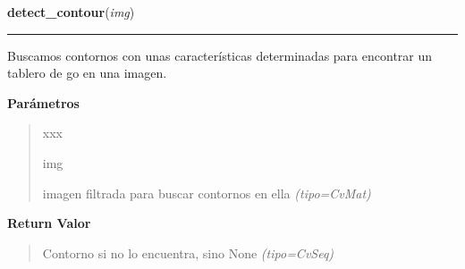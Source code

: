 \hspace{.8\funcindent}\begin{boxedminipage}{\funcwidth}

    \raggedright \textbf{detect\_contour}(\textit{img})

    \vspace{-1.5ex}

    \rule{\textwidth}{0.5\fboxrule}
\setlength{\parskip}{2ex}
Buscamos contornos con unas características determinadas para encontrar un tablero de go en una imagen.

\setlength{\parskip}{1ex}
      \textbf{Parámetros}
      \vspace{-1ex}

      \begin{quote}
        \begin{Ventry}{xxx}

          \item[img]


imagen filtrada para buscar contornos en ella
            {\it (tipo=CvMat)}

        \end{Ventry}

      \end{quote}

      \textbf{Return Valor}
    \vspace{-1ex}

      \begin{quote}

Contorno si no lo encuentra, sino None
      {\it (tipo=CvSeq)}

      \end{quote}

    \end{boxedminipage}

    \label{src:search_goban:search_goban}

    \vspace{0.5ex}


